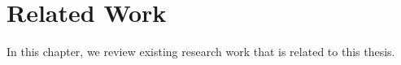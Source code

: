 \chapter{Related Work} \label{Chapter2}

In this chapter, we review existing research work that is related to this thesis. 
